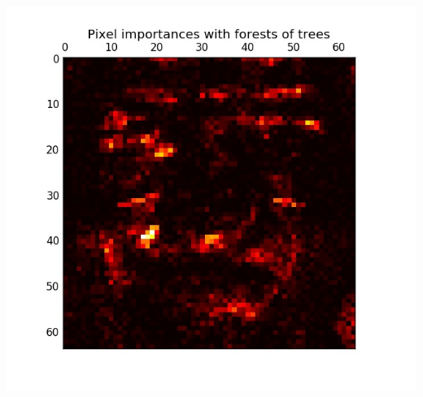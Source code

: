 \documentclass{article}
\begin{document}
\centering
\includegraphics[scale=0.4]{featureimportance.jpg}
\end{document}
